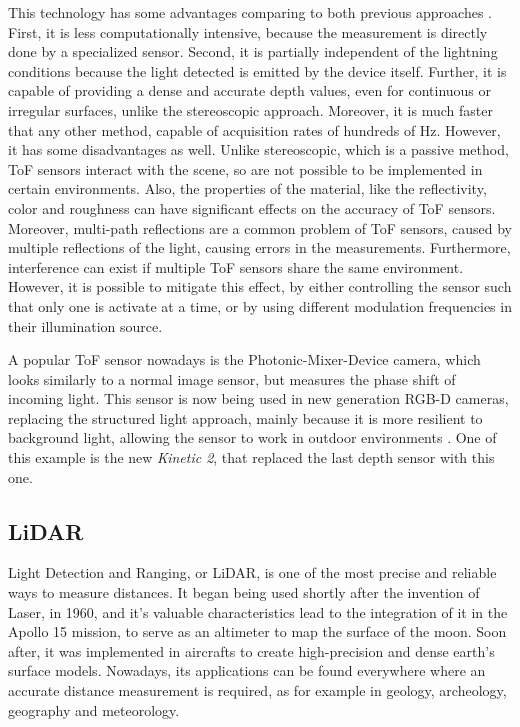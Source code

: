 This technology has some advantages comparing to both previous approaches \cite{zollhoefer2018}. First, it is less computationally intensive, because the measurement is directly done by a specialized sensor. Second, it is partially independent of the lightning conditions because the light detected is emitted by the device itself. Further, it is capable of providing a dense and accurate depth values, even for continuous or irregular surfaces, unlike the stereoscopic approach. Moreover, it is much faster that any other method, capable of acquisition rates of hundreds of \si{\hertz}. However, it has some disadvantages as well. Unlike stereoscopic, which is a passive method, ToF sensors interact with the scene, so are not possible to be implemented in certain environments. Also, the properties of the material, like the reflectivity, color and roughness can have significant effects on the accuracy of ToF sensors. Moreover, multi-path reflections are a common problem of ToF sensors, caused by multiple reflections of the light, causing errors in the measurements. Furthermore, interference can exist if multiple ToF sensors share the same environment. However, it is possible to mitigate this effect, by either controlling the sensor such that only one is activate at a time, or by using different modulation frequencies in their illumination source.

A popular ToF sensor nowadays is the Photonic-Mixer-Device camera, which looks similarly to a normal image sensor, but measures the phase shift of incoming light. This sensor is now being used in new generation RGB-D cameras, replacing the structured light approach, mainly because it is more resilient to background light, allowing the sensor to work in outdoor environments \cite{zollhoefer2018}. One of this example is the new \textit{Kinetic 2}, that replaced the last depth sensor with this one.

\subsection{LiDAR}

Light Detection and Ranging, or LiDAR, is one of the most precise and reliable ways to measure distances. It began being used shortly after the invention of Laser, in 1960, and it's valuable characteristics lead to the integration of it in the Apollo 15 mission, to serve as an altimeter to map the surface of the moon. Soon after, it was implemented in aircrafts to create high-precision and dense earth's surface models. Nowadays, its applications can be found everywhere where an accurate distance measurement is required, as for example in geology, archeology, geography and meteorology.

